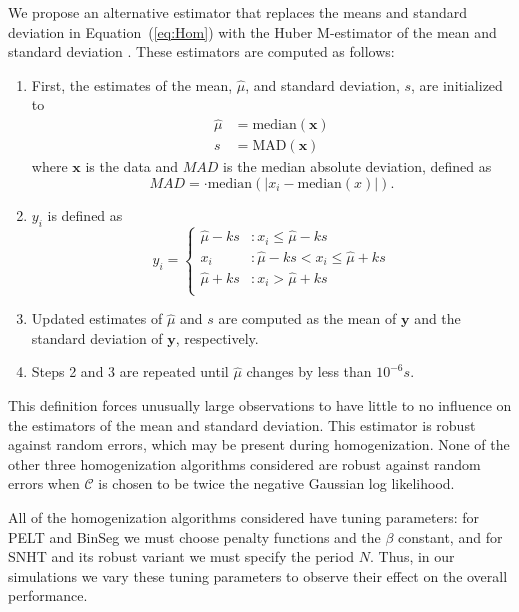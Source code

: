 \documentclass[12pt]{article}
\begin{document}
\begin{doublespacing}
We propose an alternative estimator that replaces the means and standard deviation in Equation~(\ref{eq:Hom}) with the Huber M-estimator of the mean and standard deviation \cite{huber81}.  These estimators are computed as follows:
\begin{enumerate}
	\item First, the estimates of the mean, $\hat{\mu}$, and standard deviation, $s$, are initialized to
	\begin{align*}
		\hat{\mu} &= \mbox{median}(\mathbf{x})\\
		s &= \mbox{MAD}(\mathbf{x})
	\end{align*}
	where $\mathbf{x}$ is the data and $MAD$ is the median absolute deviation, defined as
	\begin{equation*}
		MAD = \cdot \mbox{median}( \lvert x_i - \mbox{median}(x) \rvert ).
	\end{equation*}
	\item $y_i$ is defined as
	\begin{equation*}
		y_i = \left\{ \begin{array}{ll}
			\hat{\mu}-ks & : x_i \leq \hat{\mu}-ks\\
			x_i & : \hat{\mu}-ks < x_i \leq \hat{\mu}+ks\\
			\hat{\mu}+ks & : x_i > \hat{\mu}+ks\\			
		\end{array} \right.
	\end{equation*}
	\item Updated estimates of $\hat{\mu}$ and $s$ are computed as the mean of $\mathbf{y}$ and the standard deviation of $\mathbf{y}$, respectively.
	\item Steps 2 and 3 are repeated until $\hat{\mu}$ changes by less than $10^{-6} s$.
\end{enumerate}

This definition forces unusually large observations to have little to no influence on the estimators of the mean and standard deviation.    This estimator is robust against random errors, which may be present during homogenization.  None of the other three homogenization algorithms considered are robust against random errors when $\mathcal{C}$ is chosen to be twice the negative Gaussian log likelihood.

All of the homogenization algorithms considered have tuning parameters: for PELT and BinSeg we must choose penalty functions and the $\beta$ constant, and for SNHT and its robust variant we must specify the period $N$.  Thus, in our simulations we vary these tuning parameters to observe their effect on the overall performance.


\end{doublespacing}
\end{document}
